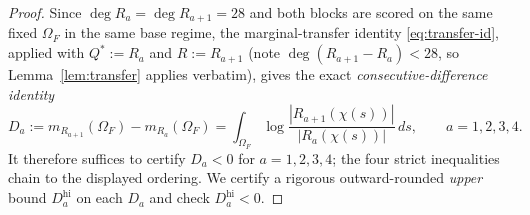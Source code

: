 \documentclass[11pt,reqno]{amsart}
\theoremstyle{plain}
\theoremstyle{definition}
\begin{document}
\begin{proof}
Since $\deg R_a=\deg R_{a+1}=28$ and both blocks are scored on the same fixed
$\Omega_F$ in the same base regime, the marginal-transfer identity
\eqref{eq:transfer-id}, applied with $Q^*:=R_a$ and $R:=R_{a+1}$ (note
$\deg(R_{a+1}-R_a)<28$, so Lemma~\ref{lem:transfer} applies verbatim), gives the exact
\emph{consecutive-difference identity}
\begin{equation}\label{eq:diff-id}
  D_a:=m_{R_{a+1}}(\Omega_F)-m_{R_a}(\Omega_F)
     =\int_{\Omega_F}\log\frac{|R_{a+1}(\chi(s))|}{|R_a(\chi(s))|}\,ds,
  \qquad a=1,2,3,4 .
\end{equation}
It therefore suffices to certify $D_a<0$ for $a=1,2,3,4$; the four strict inequalities
chain to the displayed ordering. We certify a rigorous outward-rounded \emph{upper}
bound $D_a^{\mathrm{hi}}$ on each $D_a$ and check $D_a^{\mathrm{hi}}<0$.


\end{proof}
\end{document}
